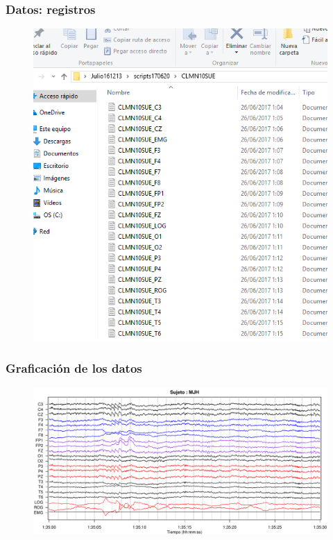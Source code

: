 \documentclass[11pt]{beamer}
\begin{document}

\begin{frame}\frametitle{Datos: registros}
\begin{figure}
\centering
\includegraphics[width=0.7\linewidth]{./curso_scripts/archivos.png}
\end{figure}
\end{frame}


\begin{frame}\frametitle{Graficaci\'on de los datos}
\begin{figure}
\centering
\includegraphics[width=\linewidth]{./img_ejemplos/MJH_190_PDG_lucirse_PSG.pdf}
\end{figure}
\end{frame}

\end{document}
